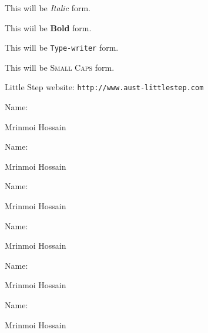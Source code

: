 \documentclass[11pt]{article}
\begin{document}
This will be \textit{Italic} form.

This wiil be \textbf{Bold} form.

This will be \texttt{Type-writer} form.

This will be \textsc{Small Caps} form.

Little Step website: \texttt{http://www.aust-littlestep.com}

Name: \begin{tiny}Mrinmoi Hossain\end{tiny}

Name: \begin{small}Mrinmoi Hossain\end{small}

Name: \begin{large}Mrinmoi Hossain\end{large}

Name: \begin{Large}Mrinmoi Hossain\end{Large}

Name: \begin{huge}Mrinmoi Hossain\end{huge}

Name: \begin{Huge}Mrinmoi Hossain\end{Huge}
\end{document}
